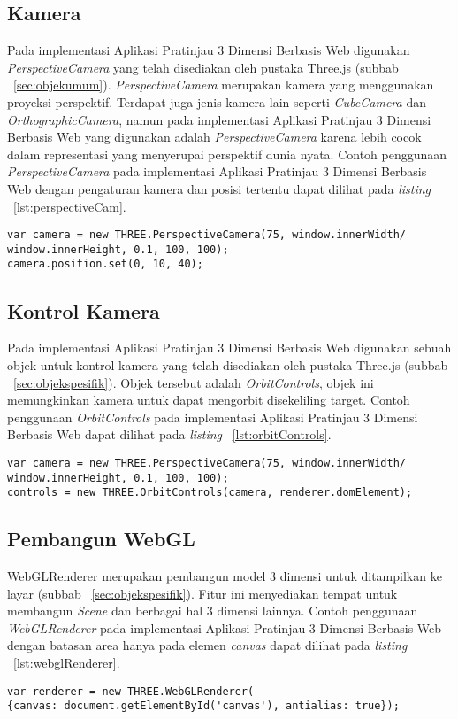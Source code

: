 \subsection{Kamera}
Pada implementasi Aplikasi Pratinjau 3 Dimensi Berbasis Web digunakan {\it PerspectiveCamera} yang telah disediakan oleh pustaka Three.js (subbab ~\ref{sec:objekumum}). {\it PerspectiveCamera} merupakan kamera yang menggunakan proyeksi perspektif. Terdapat juga jenis kamera lain seperti {\it CubeCamera} dan {\it OrthographicCamera}, namun pada implementasi Aplikasi Pratinjau 3 Dimensi Berbasis Web yang digunakan adalah {\it PerspectiveCamera} karena lebih cocok dalam representasi yang menyerupai perspektif dunia nyata. Contoh penggunaan {\it PerspectiveCamera} pada implementasi Aplikasi Pratinjau 3 Dimensi Berbasis Web dengan pengaturan kamera dan posisi tertentu dapat dilihat pada {\it listing} ~\ref{lst:perspectiveCam}.
\begin{lstlisting}[caption={Contoh penggunaan {\it PerspectiveCamera}}, label={lst:perspectiveCam},captionpos=b]
var camera = new THREE.PerspectiveCamera(75, window.innerWidth/
window.innerHeight, 0.1, 100, 100);
camera.position.set(0, 10, 40);
\end{lstlisting}

\subsection{Kontrol Kamera}
Pada implementasi Aplikasi Pratinjau 3 Dimensi Berbasis Web digunakan sebuah objek untuk kontrol kamera yang telah disediakan oleh pustaka Three.js (subbab ~\ref{sec:objekspesifik}). Objek tersebut adalah {\it OrbitControls}, objek ini memungkinkan kamera untuk dapat mengorbit disekeliling target. Contoh penggunaan {\it OrbitControls} pada implementasi Aplikasi Pratinjau 3 Dimensi Berbasis Web dapat dilihat pada {\it listing} ~\ref{lst:orbitControls}.
\begin{lstlisting}[caption={Contoh penggunaan {\it OrbitControls}}, label={lst:orbitControls},captionpos=b]
var camera = new THREE.PerspectiveCamera(75, window.innerWidth/
window.innerHeight, 0.1, 100, 100);
controls = new THREE.OrbitControls(camera, renderer.domElement);
\end{lstlisting}

\subsection{Pembangun WebGL}
WebGLRenderer merupakan pembangun model 3 dimensi untuk ditampilkan ke layar (subbab ~\ref{sec:objekspesifik}). Fitur ini menyediakan tempat untuk membangun {\it Scene} dan berbagai hal 3 dimensi lainnya. Contoh penggunaan {\it WebGLRenderer} pada implementasi Aplikasi Pratinjau 3 Dimensi Berbasis Web dengan batasan area hanya pada elemen {\it canvas} dapat dilihat pada {\it listing} ~\ref{lst:webglRenderer}.
\begin{lstlisting}[caption={Contoh penggunaan {\it WebGLRenderer}}, label={lst:webglRenderer},captionpos=b]
var renderer = new THREE.WebGLRenderer(
{canvas: document.getElementById('canvas'), antialias: true});
\end{lstlisting}
	
